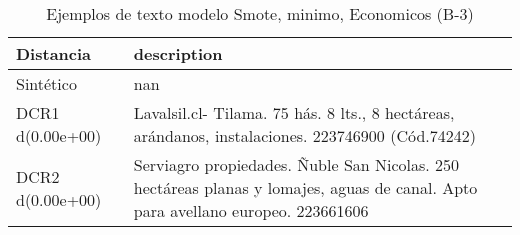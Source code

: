 \begin{table}[H]
\centering
\fontsize{10}{14}\selectfont
\caption{Ejemplos de texto modelo Smote, minimo, Economicos (B-3)}
\label{table-example-economicos-b-3-smote-enc-min-text}
\begin{tabular}{|l|m{35em}|}
\hline
\rowcolor[gray]{0.8}
Distancia & description \\
\hline Sintético & nan \\
\hline DCR1 d(0.00e+00) & Lavalsil.cl- Tilama. 75 h\'as. 8 lts., 8 hect\'areas, ar\'andanos, instalaciones. 223746900 (C\'od.74242) \\
\hline DCR2 d(0.00e+00) & Serviagro propiedades. \~Nuble San Nicolas. 250 hect\'areas planas y lomajes, aguas de canal. Apto para avellano europeo. 223661606 \\
\hline
\end{tabular}
\end{table}
